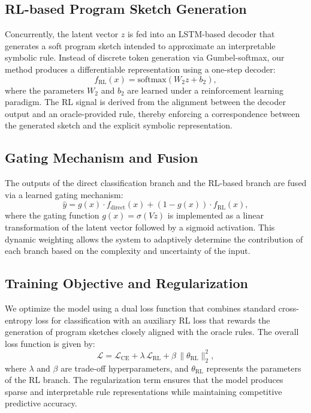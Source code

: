 \documentclass{article}
\begin{document}
\subsection{RL-based Program Sketch Generation}
Concurrently, the latent vector \( z \) is fed into an LSTM-based decoder that generates a soft program sketch intended to approximate an interpretable symbolic rule. Instead of discrete token generation via Gumbel-softmax, our method produces a differentiable representation using a one-step decoder:
\[
f_{\mathrm{RL}}(x) = \mathrm{softmax}(W_2 z + b_2),
\]
where the parameters \( W_2 \) and \( b_2 \) are learned under a reinforcement learning paradigm. The RL signal is derived from the alignment between the decoder output and an oracle-provided rule, thereby enforcing a correspondence between the generated sketch and the explicit symbolic representation.

\subsection{Gating Mechanism and Fusion}
The outputs of the direct classification branch and the RL-based branch are fused via a learned gating mechanism:
\[
\hat{y} = g(x) \cdot f_{\mathrm{direct}}(x) + (1-g(x)) \cdot f_{\mathrm{RL}}(x),
\]
where the gating function \( g(x) = \sigma(Vz) \) is implemented as a linear transformation of the latent vector followed by a sigmoid activation. This dynamic weighting allows the system to adaptively determine the contribution of each branch based on the complexity and uncertainty of the input.

\subsection{Training Objective and Regularization}
We optimize the model using a dual loss function that combines standard cross-entropy loss for classification with an auxiliary RL loss that rewards the generation of program sketches closely aligned with the oracle rules. The overall loss function is given by:
\[
\mathcal{L} = \mathcal{L}_{\mathrm{CE}} + \lambda\, \mathcal{L}_{\mathrm{RL}} + \beta\,\|\theta_{\mathrm{RL}}\|_2^2,
\]
where \(\lambda\) and \(\beta\) are trade-off hyperparameters, and \(\theta_{\mathrm{RL}}\) represents the parameters of the RL branch. The regularization term ensures that the model produces sparse and interpretable rule representations while maintaining competitive predictive accuracy.
\end{document}
